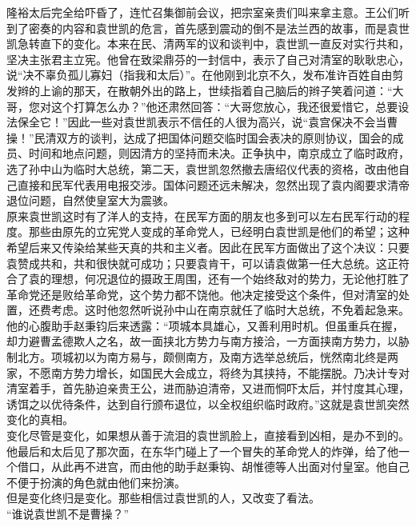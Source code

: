 隆裕太后完全给吓昏了，连忙召集御前会议，把宗室亲贵们叫来拿主意。王公们听到了密奏的内容和袁世凯的危言，首先感到震动的倒不是法兰西的故事，而是袁世凯急转直下的变化。本来在民、清两军的议和谈判中，袁世凯一直反对实行共和，坚决主张君主立宪。他曾在致梁鼎芬的一封信中，表示了自己对清室的耿耿忠心，说“决不辜负孤儿寡妇（指我和太后）”。在他刚到北京不久，发布准许百姓自由剪发辫的上谕的那天，在散朝外出的路上，世续指着自己脑后的辫子笑着问道：“大哥，您对这个打算怎么办？”他还肃然回答：“大哥您放心，我还很爱惜它，总要设法保全它！”因此一些对袁世凯表示不信任的人很为高兴，说“袁宫保决不会当曹操！”民清双方的谈判，达成了把国体问题交临时国会表决的原则协议，国会的成员、时间和地点问题，则因清方的坚持而未决。正争执中，南京成立了临时政府，选了孙中山为临时大总统，第二天，袁世凯忽然撤去唐绍仪代表的资格，改由他自己直接和民军代表用电报交涉。国体问题还远未解决，忽然出现了袁内阁要求清帝退位问题，自然使皇室大为震骇。\\

原来袁世凯这时有了洋人的支持，在民军方面的朋友也多到可以左右民军行动的程度。那些由原先的立宪党人变成的革命党人，已经明白袁世凯是他们的希望；这种希望后来又传染给某些天真的共和主义者。因此在民军方面做出了这个决议：只要袁赞成共和，共和很快就可成功；只要袁肯干，可以请袁做第一任大总统。这正符合了袁的理想，何况退位的摄政王周围，还有一个始终敌对的势力，无论他打胜了革命党还是败给革命党，这个势力都不饶他。他决定接受这个条件，但对清室的处置，还费考虑。这时他忽然听说孙中山在南京就任了临时大总统，不免着起急来。他的心腹助手赵秉钧后来透露：“项城本具雄心，又善利用时机。但虽重兵在握，却力避曹孟德欺人之名，故一面挟北方势力与南方接洽，一方面挟南方势力，以胁制北方。项城初以为南方易与，颇侧南方，及南方选举总统后，恍然南北终是两家，不愿南方势力增长，如国民大会成立，将终为其挟持，不能摆脱。乃决计专对清室着手，首先胁迫亲贵王公，进而胁迫清帝，又进而恫吓太后，并忖度其心理，诱饵之以优待条件，达到自行颁布退位，以全权组织临时政府。”这就是袁世凯突然变化的真相。\\

变化尽管是变化，如果想从善于流泪的袁世凯脸上，直接看到凶相，是办不到的。他最后和太后见了那次面，在东华门碰上了一个冒失的革命党人的炸弹，给了他一个借口，从此再不进宫，而由他的助手赵秉钩、胡惟德等人出面对付皇室。他自己不便于扮演的角色就由他们来扮演。\\

但是变化终归是变化。那些相信过袁世凯的人，又改变了看法。\\

“谁说袁世凯不是曹操？”\\

